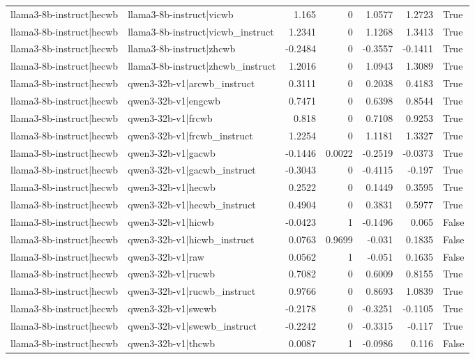 \begin{table}
\begin{tabular}{l l r r r r l}
llama3-8b-instruct|hecwb & llama3-8b-instruct|vicwb & 1.165 & 0 & 1.0577 & 1.2723 & True \\
llama3-8b-instruct|hecwb & llama3-8b-instruct|vicwb_instruct & 1.2341 & 0 & 1.1268 & 1.3413 & True \\
llama3-8b-instruct|hecwb & llama3-8b-instruct|zhcwb & -0.2484 & 0 & -0.3557 & -0.1411 & True \\
llama3-8b-instruct|hecwb & llama3-8b-instruct|zhcwb_instruct & 1.2016 & 0 & 1.0943 & 1.3089 & True \\
llama3-8b-instruct|hecwb & qwen3-32b-v1|arcwb_instruct & 0.3111 & 0 & 0.2038 & 0.4183 & True \\
llama3-8b-instruct|hecwb & qwen3-32b-v1|engcwb & 0.7471 & 0 & 0.6398 & 0.8544 & True \\
llama3-8b-instruct|hecwb & qwen3-32b-v1|frcwb & 0.818 & 0 & 0.7108 & 0.9253 & True \\
llama3-8b-instruct|hecwb & qwen3-32b-v1|frcwb_instruct & 1.2254 & 0 & 1.1181 & 1.3327 & True \\
llama3-8b-instruct|hecwb & qwen3-32b-v1|gacwb & -0.1446 & 0.0022 & -0.2519 & -0.0373 & True \\
llama3-8b-instruct|hecwb & qwen3-32b-v1|gacwb_instruct & -0.3043 & 0 & -0.4115 & -0.197 & True \\
llama3-8b-instruct|hecwb & qwen3-32b-v1|hecwb & 0.2522 & 0 & 0.1449 & 0.3595 & True \\
llama3-8b-instruct|hecwb & qwen3-32b-v1|hecwb_instruct & 0.4904 & 0 & 0.3831 & 0.5977 & True \\
llama3-8b-instruct|hecwb & qwen3-32b-v1|hicwb & -0.0423 & 1 & -0.1496 & 0.065 & False \\
llama3-8b-instruct|hecwb & qwen3-32b-v1|hicwb_instruct & 0.0763 & 0.9699 & -0.031 & 0.1835 & False \\
llama3-8b-instruct|hecwb & qwen3-32b-v1|raw & 0.0562 & 1 & -0.051 & 0.1635 & False \\
llama3-8b-instruct|hecwb & qwen3-32b-v1|rucwb & 0.7082 & 0 & 0.6009 & 0.8155 & True \\
llama3-8b-instruct|hecwb & qwen3-32b-v1|rucwb_instruct & 0.9766 & 0 & 0.8693 & 1.0839 & True \\
llama3-8b-instruct|hecwb & qwen3-32b-v1|swcwb & -0.2178 & 0 & -0.3251 & -0.1105 & True \\
llama3-8b-instruct|hecwb & qwen3-32b-v1|swcwb_instruct & -0.2242 & 0 & -0.3315 & -0.117 & True \\
llama3-8b-instruct|hecwb & qwen3-32b-v1|thcwb & 0.0087 & 1 & -0.0986 & 0.116 & False \\

\end{tabular}
\end{table}
